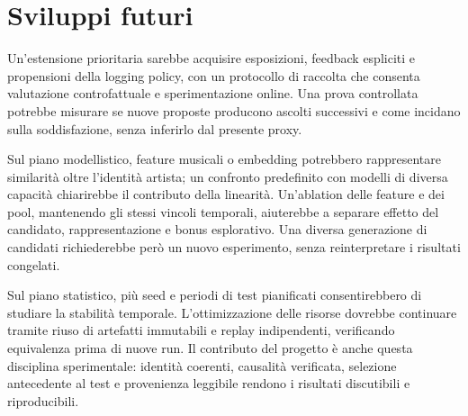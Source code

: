 
\section{Sviluppi futuri}
Un'estensione prioritaria sarebbe acquisire esposizioni, feedback espliciti e propensioni della logging policy, con un protocollo di raccolta che consenta valutazione controfattuale e sperimentazione online. Una prova controllata potrebbe misurare se nuove proposte producono ascolti successivi e come incidano sulla soddisfazione, senza inferirlo dal presente proxy.

Sul piano modellistico, feature musicali o embedding potrebbero rappresentare similarità oltre l'identità artista; un confronto predefinito con modelli di diversa capacità chiarirebbe il contributo della linearità. Un'ablation delle feature e dei pool, mantenendo gli stessi vincoli temporali, aiuterebbe a separare effetto del candidato, rappresentazione e bonus esplorativo. Una diversa generazione di candidati richiederebbe però un nuovo esperimento, senza reinterpretare i risultati congelati.

Sul piano statistico, più seed e periodi di test pianificati consentirebbero di studiare la stabilità temporale. L'ottimizzazione delle risorse dovrebbe continuare tramite riuso di artefatti immutabili e replay indipendenti, verificando equivalenza prima di nuove run. Il contributo del progetto è anche questa disciplina sperimentale: identità coerenti, causalità verificata, selezione antecedente al test e provenienza leggibile rendono i risultati discutibili e riproducibili.

